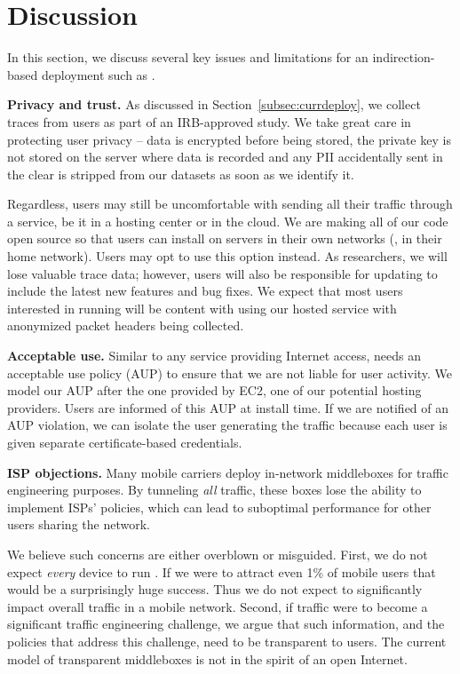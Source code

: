 \section{Discussion}
\label{sec:discussion}
In this section, we discuss several key issues and limitations for an indirection-based 
deployment such as \meddle.
 
\noindent\textbf{Privacy and trust.} As discussed in Section~\ref{subsec:currdeploy}, we 
collect traces from users as part of an IRB-approved study. We take great care in 
protecting user privacy -- data is encrypted before being stored, the private key is 
not stored on the server where data is recorded and any PII accidentally sent in the 
clear is stripped from our datasets as soon as we identify it. 

Regardless, users may still be uncomfortable with sending all their traffic through a 
\meddle service, be it in a hosting center or in the cloud. We are making all of 
our code open source so that users can install \meddle on servers in their 
own networks (\eg, in their home network). Users may opt to use this option instead. 
As researchers, we will lose valuable trace data; however, users will also be responsible 
for updating \meddle to include the latest new features and bug fixes. We expect 
that most users interested in running \meddle will be content with using our hosted 
\meddle service with anonymized packet headers being collected. 

\noindent\textbf{Acceptable use.} Similar to any service providing Internet access, 
\meddle needs an acceptable use policy (AUP) to ensure that we are not liable for 
user activity. We model our AUP after the one provided by EC2, one of our potential 
hosting providers. Users are informed of this AUP at install time. If we are notified 
of an AUP violation, we can isolate the user generating the traffic because each 
user is given separate certificate-based credentials.

\noindent\textbf{ISP objections.} Many mobile carriers deploy in-network middleboxes 
for traffic engineering purposes. By tunneling \emph{all} traffic, these boxes lose the 
ability to implement ISPs' policies, which can lead to suboptimal performance for 
other users sharing the network. 

We believe such concerns are either overblown or misguided. First, we do not 
expect \emph{every} device to run \meddle. If we were to attract even 1\% of 
mobile users that would be a surprisingly huge success. Thus we do not expect 
\meddle to significantly impact overall traffic in a mobile network. Second, if \meddle 
traffic were to become a significant traffic engineering challenge, we argue that 
such information, and the policies that address this challenge, need to be 
transparent to users. The current model of transparent middleboxes is not 
in the spirit of an open Internet.


